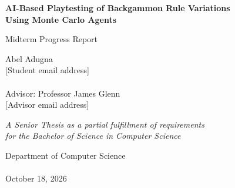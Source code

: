 \begin{titlepage}
    \begin{center}
        \vspace*{1cm}

        \huge
        \textbf{AI-Based Playtesting of Backgammon Rule Variations \\
        Using Monte Carlo Agents}

        \vspace{0.5cm}
        \LARGE
        Midterm Progress Report

        \vspace{1cm}

        \Large
        Abel Adugna\\
        [Student email address]\\~\\
        Advisor: Professor James Glenn\\
        [Advisor email address]

        \vfill

        \textit{A Senior Thesis as a partial fulfillment
        of requirements \\for the Bachelor of Science in Computer Science}

        \vspace{0.8cm}

        \Large
        Department of Computer Science\\
        [University Name]\\
        October 18, 2026
    \end{center}
\end{titlepage}

